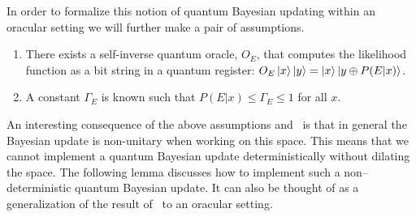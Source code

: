 \documentclass[aps,amsmath,onecolumn,amssymb]{revtex4}
\begin{document}
In order to formalize this notion of quantum Bayesian updating within an oracular setting we will further make a pair of assumptions.
\begin{enumerate}
\item There exists a self-inverse quantum oracle, $O_E$, that computes the likelihood function as a bit string in a quantum register: $O_E\left|x\right\rangle\left|y\right\rangle = \left|x\right\rangle\left|y\oplus P(E|x)\right\rangle$.
\item A constant $\Gamma_E$ is known such that $P(E|x) \le \Gamma_E \le 1$ for all $x$.
\end{enumerate}


An interesting consequence of the above assumptions and~ is that in general the Bayesian update is non-unitary when working on this space.  This means that we cannot  implement a quantum Bayesian update deterministically without dilating the space.
The following lemma discusses how to implement such a non--deterministic quantum Bayesian update.  It can also be thought of as a generalization of the result of~\cite{LYC14} to an oracular setting.
\end{document}
